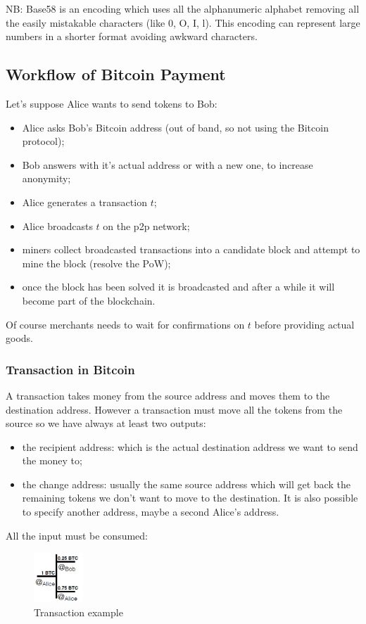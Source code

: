 NB: Base58 is an encoding which uses all the alphanumeric alphabet removing all the easily mistakable characters (like 0, O, I, l).
This encoding can represent large numbers in a shorter format avoiding awkward characters.

\subsection{Workflow of Bitcoin Payment}
Let's suppose Alice wants to send tokens to Bob:
\begin{itemize}
    \item Alice asks Bob's Bitcoin address (out of band, so not using the Bitcoin protocol);
    \item Bob answers with it's actual address or with a new one, to increase anonymity;
    \item Alice generates a transaction $t$;
    \item Alice broadcasts $t$ on the p2p network;
    \item miners collect broadcasted transactions into a candidate block and attempt to mine the block (resolve the PoW);
    \item once the block has been solved it is broadcasted and after a while it will become part of the blockchain.
\end{itemize}
Of course merchants needs to wait for confirmations on $t$ before providing actual goods.

\subsubsection{Transaction in Bitcoin}
A transaction takes money from the source address and moves them to the destination address.
However a transaction must move all the tokens from the source so we have always at least two outputs:
\begin{itemize}
    \item the recipient address: which is the actual destination address we want to send the money to;
    \item the change address: usually the same source address which will get back the remaining tokens we don't want to move to the destination.
    It is also possible to specify another address, maybe a second Alice's address.
\end{itemize}
All the input must be consumed:
\begin{figure}[H]
    \centering
    \includegraphics[width=70px]{images/6_Bitcoin/01.png}
    \caption{Transaction example}
\end{figure}


